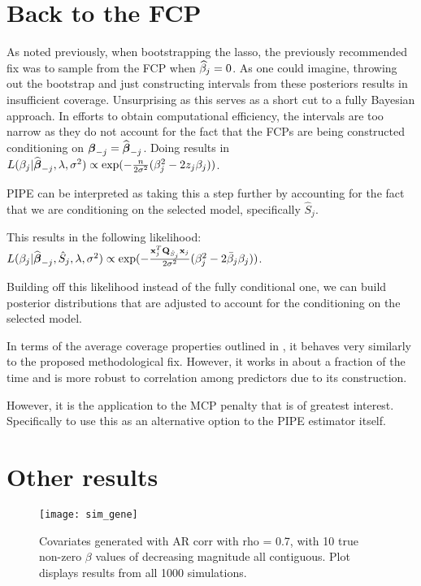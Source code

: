 \section{Back to the FCP}

As noted previously, when bootstrapping the lasso, the previously recommended fix was to sample from the FCP when $\widehat{\beta}_j = 0$. As one could imagine, throwing out the bootstrap and just constructing intervals from these posteriors results in insufficient coverage. Unsurprising as this serves as a short cut to a fully Bayesian approach. In efforts to obtain computational efficiency, the intervals are too narrow as they do not account for the fact that the FCPs are being constructed conditioning on $\boldsymbol{\beta}_{-j} = \widehat{\boldsymbol{\beta}}_{-j}$. Doing results in $L(\beta_j|\widehat{\boldsymbol{\beta}}_{-j}, \lambda, \sigma^2) \propto \exp(-\frac{n}{2\sigma^2}(\beta_{j}^2 - 2 z_{j} \beta_{j}))$.

PIPE can be interpreted as taking this a step further by accounting for the fact that we are conditioning on the selected model, specifically $\hat{S}_j$. 


This results in the following likelihood: $L(\beta_j|\widehat{\boldsymbol{\beta}}_{-j}, \hat{S}_j, \lambda, \sigma^2) \propto \exp(-\frac{\mathbf{x}_j^T \mathbf{Q}_{\hat{S}_j} \mathbf{x}_j}{2\sigma^2}(\beta_{j}^2 - 2 \bar{\beta}_{j} \beta_{j}))$. 

Building off this likelihood instead of the fully conditional one, we can build posterior distributions that are adjusted to account for the conditioning on the selected model.

In terms of the average coverage properties outlined in , it behaves very similarly to the proposed methodological fix. However, it works in about a fraction of the time and is more robust to correlation among predictors due to its construction. 

However, it is the application to the MCP penalty that is of greatest interest. Specifically to use this as an alternative option to the PIPE estimator itself.

\section{Other results}

\begin{figure}[hbtp]
    \begin{center}
    \texttt{[image: sim\_gene]}
    \caption{\label{Fig:sim_gene} Covariates generated with AR corr with rho = 0.7, with 10 true non-zero $\beta$ values of decreasing magnitude all contiguous. Plot displays results from all 1000 simulations.}
    \end{center}
\end{figure}

